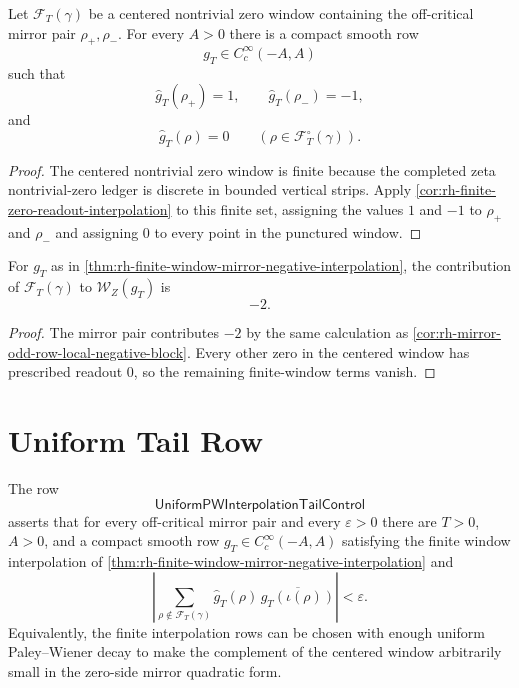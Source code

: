 \begin{theorem}
\label{thm:rh-finite-window-mirror-negative-interpolation}
Let $\mathcal F_T(\gamma)$ be a centered nontrivial zero window
containing the off-critical mirror pair $\rho_+,\rho_-$.  For every
$A>0$ there is a compact smooth row
$$
g_T\in C_c^\infty(-A,A)
$$
such that
$$
\widehat g_T(\rho_+)=1,
\qquad
\widehat g_T(\rho_-)=-1,
$$
and
$$
\widehat g_T(\rho)=0
\qquad
(\rho\in\mathcal F_T^\circ(\gamma)).
$$
\end{theorem}

\begin{proof}
The centered nontrivial zero window is finite because the completed zeta
nontrivial-zero ledger is discrete in bounded vertical strips.  Apply
\autoref{cor:rh-finite-zero-readout-interpolation} to this finite set,
assigning the values $1$ and $-1$ to $\rho_+$ and $\rho_-$ and assigning
$0$ to every point in the punctured window.
\end{proof}

\begin{corollary}
\label{cor:rh-finite-window-contribution-exactly-negative}
For $g_T$ as in
\autoref{thm:rh-finite-window-mirror-negative-interpolation}, the
contribution of $\mathcal F_T(\gamma)$ to $\mathcal W_Z(g_T)$ is
$$
-2.
$$
\end{corollary}

\begin{proof}
The mirror pair contributes $-2$ by the same calculation as
\autoref{cor:rh-mirror-odd-row-local-negative-block}.  Every other zero
in the centered window has prescribed readout $0$, so the remaining
finite-window terms vanish.
\end{proof}

\section{Uniform Tail Row}
\label{sec:rh-pw-zero-pair-uniform-tail-row}

\begin{definition}[UniformPWInterpolationTailControl]
\label{def:rh-uniform-pw-interpolation-tail-control}
The row
$$
\mathsf{UniformPWInterpolationTailControl}
$$
asserts that for every off-critical mirror pair and every
$\varepsilon>0$ there are $T>0$, $A>0$, and a compact smooth row
$g_T\in C_c^\infty(-A,A)$ satisfying the finite window interpolation of
\autoref{thm:rh-finite-window-mirror-negative-interpolation} and
$$
\left|
\sum_{\rho\notin\mathcal F_T(\gamma)}
\widehat g_T(\rho)\,
\overline{\widehat g_T(\iota(\rho))}
\right|
<
\varepsilon.
$$
Equivalently, the finite interpolation rows can be chosen with enough
uniform Paley--Wiener decay to make the complement of the centered
window arbitrarily small in the zero-side mirror quadratic form.
\end{definition}

